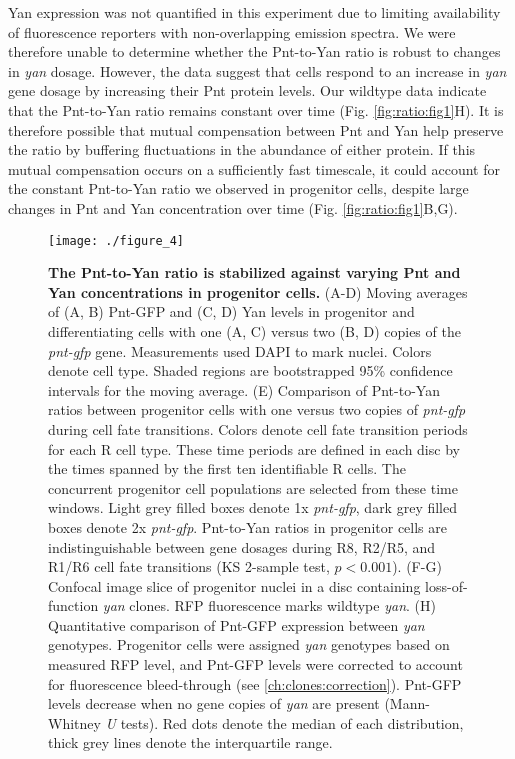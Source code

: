 Yan expression was not quantified in this experiment due to limiting availability of fluorescence reporters with non-overlapping emission spectra. We were therefore unable to determine whether the Pnt-to-Yan ratio is robust to changes in \textit{yan} dosage. However, the data suggest that cells respond to an increase in \textit{yan} gene dosage by increasing their Pnt protein levels. Our wildtype data indicate that the Pnt-to-Yan ratio remains constant over time (Fig. \ref{fig:ratio:fig1}H). It is therefore possible that mutual compensation between Pnt and Yan help preserve the ratio by buffering fluctuations in the abundance of either protein. If this mutual compensation occurs on a sufficiently fast timescale, it could account for the constant Pnt-to-Yan ratio we observed in progenitor cells, despite large changes in Pnt and Yan concentration over time (Fig. \ref{fig:ratio:fig1}B,G).

\begin{figure}[!h]
\centering
\texttt{[image: ./figure\_4]}
\caption[P:Y ratio is stabilized against varying Pnt and Yan concentrations.]{\textbf{The Pnt-to-Yan ratio is stabilized against varying Pnt and Yan concentrations in progenitor cells.} (A-D) Moving averages of (A, B) Pnt-GFP and (C, D) Yan levels in progenitor and differentiating cells with one (A, C) versus two (B, D) copies of the \textit{pnt-gfp} gene. Measurements used DAPI to mark nuclei. Colors denote cell type. Shaded regions are bootstrapped 95\% confidence intervals for the moving average. (E) Comparison of Pnt-to-Yan ratios between progenitor cells with one versus two copies of \textit{pnt-gfp} during cell fate transitions. Colors denote cell fate transition periods for each R cell type. These time periods are defined in each disc by the times spanned by the first ten identifiable R cells. The concurrent progenitor cell populations are selected from these time windows. Light grey filled boxes denote 1x \textit{pnt-gfp}, dark grey filled boxes denote 2x \textit{pnt-gfp}. Pnt-to-Yan ratios in progenitor cells are indistinguishable between gene dosages during R8, R2/R5, and R1/R6 cell fate transitions (KS 2-sample test, $p<0.001$). (F-G) Confocal image slice of progenitor nuclei in a disc containing loss-of-function \textit{yan} clones. RFP fluorescence marks wildtype \textit{yan}. (H) Quantitative comparison of Pnt-GFP expression between \textit{yan} genotypes. Progenitor cells were assigned \textit{yan} genotypes based on measured RFP level, and Pnt-GFP levels were corrected to account for fluorescence bleed-through (see \ref{ch:clones:correction}). Pnt-GFP levels decrease when no gene copies of \textit{yan} are present (Mann-Whitney \textit{U} tests). Red dots denote the median of each distribution, thick grey lines denote the interquartile range.}
\label{fig:ratio:fig4}
\end{figure}

